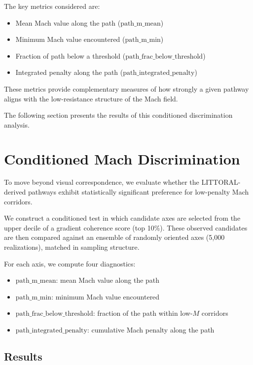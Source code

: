 \documentclass[twocolumn,10pt]{article}
\begin{document}
The key metrics considered are:

\begin{itemize}
\item Mean Mach value along the path ($\text{path\_m\_mean}$)
\item Minimum Mach value encountered ($\text{path\_m\_min}$)
\item Fraction of path below a threshold ($\text{path\_frac\_below\_threshold}$)
\item Integrated penalty along the path ($\text{path\_integrated\_penalty}$)
\end{itemize}

These metrics provide complementary measures of how strongly a given pathway aligns with the low-resistance structure of the Mach field.

The following section presents the results of this conditioned discrimination analysis.


\section{Conditioned Mach Discrimination}

To move beyond visual correspondence, we evaluate whether the LITTORAL-derived pathways exhibit statistically significant preference for low-penalty Mach corridors.

We construct a conditioned test in which candidate axes are selected from the upper decile of a gradient coherence score (top 10\%). These observed candidates are then compared against an ensemble of randomly oriented axes (5,000 realizations), matched in sampling structure.

For each axis, we compute four diagnostics:

\begin{itemize}
\item $\text{path\_m\_mean}$: mean Mach value along the path
\item $\text{path\_m\_min}$: minimum Mach value encountered
\item $\text{path\_frac\_below\_threshold}$: fraction of the path within low-$M$ corridors
\item $\text{path\_integrated\_penalty}$: cumulative Mach penalty along the path
\end{itemize}

\subsection{Results}
\end{document}
